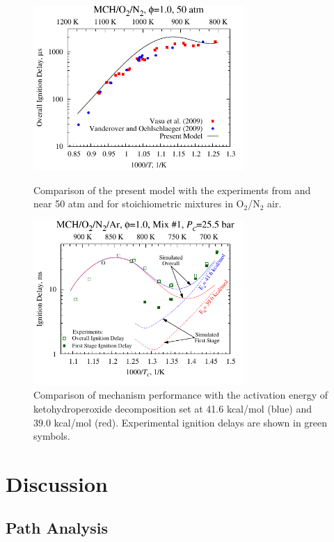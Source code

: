 \documentclass[12pt, letterpaper]{article}
\begin{document}
\begin{figure}
    \centering
    \begin{minipage}[t]{0.45\textwidth}
        \includegraphics[width=8cm]{../figures/05-MCH/mch-shocks}
        \caption{Comparison of the present model with the experiments from 
            \textcite{Vasu2009} and \textcite{Vanderover2009} near 50 atm 
            and for stoichiometric mixtures in O$_2$/N$_2$ air.}
        \label{fig:mch-shocks}
    \end{minipage}
    \quad
    \begin{minipage}[t]{0.45\textwidth}
        \includegraphics[width=8cm]{../figures/05-MCH/mch-energy}
        \caption{Comparison of mechanism performance with the activation energy 
            of ketohydroperoxide decomposition set at 41.6 kcal/mol (blue) and 
            39.0 kcal/mol (red). Experimental ignition delays are shown in 
            green symbols.}
        \label{fig:mch-energy}
    \end{minipage}
\end{figure}

\section{Discussion}
\label{sec:discussion}
\subsection{Path Analysis}
\label{sec:path-analysis}
\end{document}
